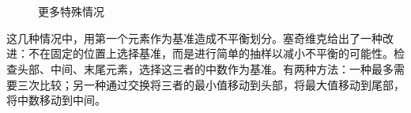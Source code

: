 \documentclass[b5paper]{ctexart}
\begin{document}
\begin{figure}[htbp]
   \centering
    \\
    \\
   \caption{更多特殊情况}
   \label{fig:worst-cases-2}
\end{figure}

这几种情况中，用第一个元素作为基准造成不平衡划分。塞奇维克给出了一种改进\cite{qsort-impl}：不在固定的位置上选择基准，而是进行简单的抽样以减小不平衡的可能性。检查头部、中间、末尾元素，选择这三者的中数作为基准。有两种方法：一种最多需要三次比较\cite{3-way-part}；另一种通过交换将三者的最小值移动到头部，将最大值移动到尾部，将中数移动到中间。
\end{document}
